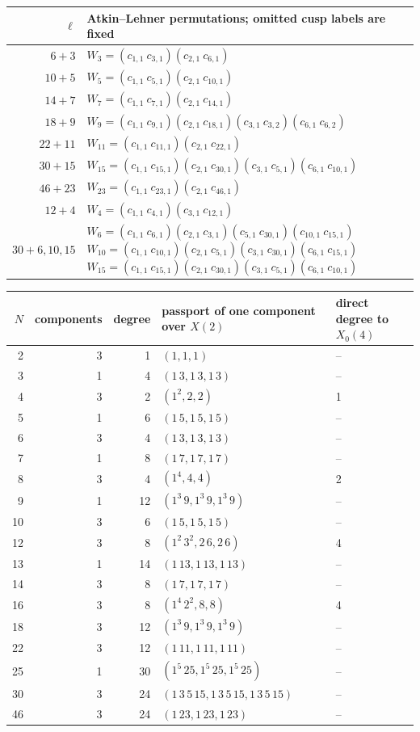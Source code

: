 \begin{longtable}{r|p{}}
$\ell$ & Atkin--Lehner permutations; omitted cusp labels are fixed\\\hline
$6+3$ & $W_{3}=(c_{1,1}\ c_{3,1})(c_{2,1}\ c_{6,1})$\\
$10+5$ & $W_{5}=(c_{1,1}\ c_{5,1})(c_{2,1}\ c_{10,1})$\\
$14+7$ & $W_{7}=(c_{1,1}\ c_{7,1})(c_{2,1}\ c_{14,1})$\\
$18+9$ & $W_{9}=(c_{1,1}\ c_{9,1})(c_{2,1}\ c_{18,1})(c_{3,1}\ c_{3,2})(c_{6,1}\ c_{6,2})$\\
$22+11$ & $W_{11}=(c_{1,1}\ c_{11,1})(c_{2,1}\ c_{22,1})$\\
$30+15$ & $W_{15}=(c_{1,1}\ c_{15,1})(c_{2,1}\ c_{30,1})(c_{3,1}\ c_{5,1})(c_{6,1}\ c_{10,1})$\\
$46+23$ & $W_{23}=(c_{1,1}\ c_{23,1})(c_{2,1}\ c_{46,1})$\\
$12+4$ & $W_{4}=(c_{1,1}\ c_{4,1})(c_{3,1}\ c_{12,1})$\\
$30+6,10,15$ & $W_{6}=(c_{1,1}\ c_{6,1})(c_{2,1}\ c_{3,1})(c_{5,1}\ c_{30,1})(c_{10,1}\ c_{15,1})$\newline $W_{10}=(c_{1,1}\ c_{10,1})(c_{2,1}\ c_{5,1})(c_{3,1}\ c_{30,1})(c_{6,1}\ c_{15,1})$\newline $W_{15}=(c_{1,1}\ c_{15,1})(c_{2,1}\ c_{30,1})(c_{3,1}\ c_{5,1})(c_{6,1}\ c_{10,1})$\\
\end{longtable}
\begin{longtable}{r|r|r|l|l}
$N$ & components & degree & passport of one component over $X(2)$ & direct degree to $X_0(4)$\\\hline
2 & 3 & 1 & $(1,1,1)$ & --\\
3 & 1 & 4 & $(1\,3,1\,3,1\,3)$ & --\\
4 & 3 & 2 & $(1^{2},2,2)$ & 1\\
5 & 1 & 6 & $(1\,5,1\,5,1\,5)$ & --\\
6 & 3 & 4 & $(1\,3,1\,3,1\,3)$ & --\\
7 & 1 & 8 & $(1\,7,1\,7,1\,7)$ & --\\
8 & 3 & 4 & $(1^{4},4,4)$ & 2\\
9 & 1 & 12 & $(1^{3}\,9,1^{3}\,9,1^{3}\,9)$ & --\\
10 & 3 & 6 & $(1\,5,1\,5,1\,5)$ & --\\
12 & 3 & 8 & $(1^{2}\,3^{2},2\,6,2\,6)$ & 4\\
13 & 1 & 14 & $(1\,13,1\,13,1\,13)$ & --\\
14 & 3 & 8 & $(1\,7,1\,7,1\,7)$ & --\\
16 & 3 & 8 & $(1^{4}\,2^{2},8,8)$ & 4\\
18 & 3 & 12 & $(1^{3}\,9,1^{3}\,9,1^{3}\,9)$ & --\\
22 & 3 & 12 & $(1\,11,1\,11,1\,11)$ & --\\
25 & 1 & 30 & $(1^{5}\,25,1^{5}\,25,1^{5}\,25)$ & --\\
30 & 3 & 24 & $(1\,3\,5\,15,1\,3\,5\,15,1\,3\,5\,15)$ & --\\
46 & 3 & 24 & $(1\,23,1\,23,1\,23)$ & --\\
\end{longtable}
